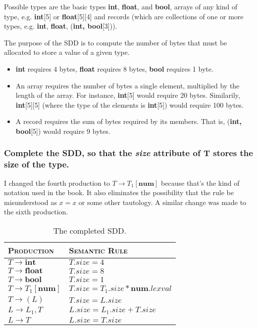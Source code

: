 Possible types are the basic types \textbf{int}, \textbf{float}, and \textbf{bool}, arrays of any kind of type, e.g. \textbf{int}[5] or \textbf{float}[5][4] and records (which are collections of one or more types, e.g. \textbf{int}, \textbf{float}, (\textbf{int, bool}[3])).

The purpose of the SDD is to compute the number of bytes that must be allocated to store a value of a given type.
\begin{itemize}
	\item \textbf{int} requires 4 bytes, \textbf{float} requires 8 bytes, \textbf{bool} requires 1 byte.
	\item An array requires the number of bytes a single element, multiplied by the length of the array. For instance, \textbf{int}[5] would require 20 bytes. Similarily, \textbf{int}[5][5] (where the type of the elements is \textbf{int}[5]) would require 100 bytes.
	\item A record requires the sum of bytes required by its members. That is, (\textbf{int, bool}[5]) would require 9 bytes.
\end{itemize}

\subsubsection{Complete the SDD, so that the \textit{size} attribute of T stores the size of the type.}
I changed the fourth production to $T\rightarrow T_{1}[\mathbf{num}]$ because that's the kind of notation used in the book.
It also eliminates the possibility that the rule be misunderstood as $x=x$ or some other tautology.
A similar change was made to the sixth production.
\begin{table}[H]
\centering
\begin{tabular}{l|l}
	\hline \hline
	\textsc{Production} 			& \textsc{Semantic Rule} \\ \hline
	$T \rightarrow \mathbf{int}$			& $T.size = 4$	\\
	$T \rightarrow \mathbf{float}$			& $T.size = 8$	\\
	$T \rightarrow \mathbf{bool}$ 			& $T.size = 1$	\\
	$T \rightarrow T_{1}\mathbf{[num]}$		& $T.size = T_1.size * \mathbf{num}.lexval$\\
	$T \rightarrow (L)$ 					& $T.size = L.size$ \\
	$L \rightarrow L_{1},T$					& $L.size = L_1.size + T.size$	\\
	$L \rightarrow T$						& $L.size = T.size$	\\
	\hline
\end{tabular}
\label{tab:4-a}
\caption{The completed SDD.}
\end{table}

